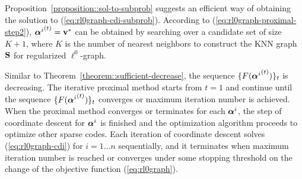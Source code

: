 \documentclass[10pt,twocolumn,letterpaper]{article}
\begin{document}
Proposition~\ref{proposition::sol-to-subprob} suggests an efficient way of obtaining the solution to (\ref{eq:rl0graph-cdi-subprob}). According to (\ref{eq:rl0graph-proximal-step2}), ${\bm{\alpha}^i}^{(t)} = \mathbf{v}^{*}$ can be obtained by searching over a candidate set of size $K+1$, where $K$ is the number of nearest neighbors to construct the KNN graph $\mathbf{S}$ for regularized $\ell^{0}$-graph.

Similar to Theorem~\ref{theorem::sufficient-decrease}, the sequence $\{F({\bm{\alpha}^i}^{(t)})\}_t$ is decreasing. The iterative proximal method starts from $t=1$ and continue until the sequence $\{F({\bm{\alpha}^i}^{(t)})\}_t$ converges or maximum iteration number is achieved. When the proximal method converges or terminates for each $\bm{\alpha}^i$, the step of coordinate descent for $\bm{\alpha}^i$ is finished and the optimization algorithm proceeds to optimize other sparse codes. Each iteration of coordinate descent solves (\ref{eq:rl0graph-cdi}) for $i=1 \ldots n$ sequentially, and it terminates when maximum iteration number is reached or converges under some stopping threshold on the change of the objective function (\ref{eq:rl0graph}).

%
%
%
%
%
\end{document}
